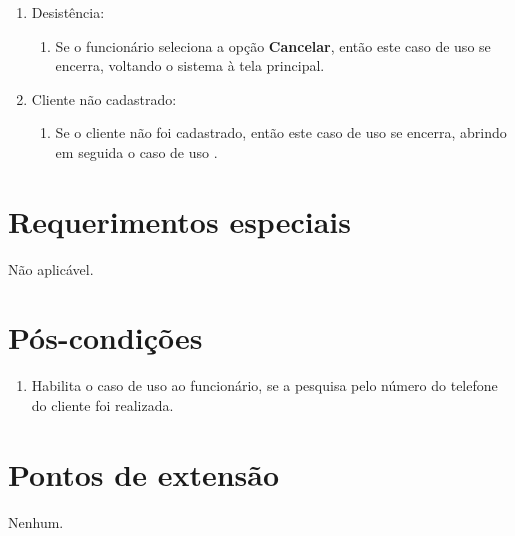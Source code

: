 \begin{enumerate}
	\item Desistência:
	\begin{enumerate}
		\item Se o funcionário seleciona a opção \textbf{Cancelar}, então este caso de uso se encerra, voltando o sistema à tela principal.
	\end{enumerate}
	\item Cliente não cadastrado:
	\begin{enumerate}
		\item Se o cliente não foi cadastrado, então este caso de uso se encerra, abrindo em seguida o caso de uso .
	\end{enumerate}
\end{enumerate}

\section{Requerimentos especiais}

Não aplicável.

\section{Pós-condições}

\begin{enumerate}
	\item Habilita o caso de uso  ao funcionário, se a pesquisa pelo número do telefone do cliente foi realizada.
\end{enumerate}

\section{Pontos de extensão}

Nenhum.